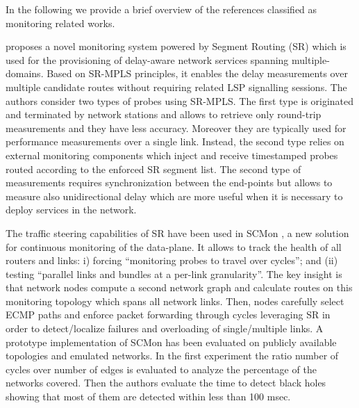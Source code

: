 In the following we provide a brief overview of the references classified as monitoring related works.

\cite{interoperable} proposes a novel monitoring system powered by Segment Routing (SR) which is used for the provisioning of delay-aware network services spanning multiple-domains. Based on SR-MPLS principles, it enables the delay measurements over multiple candidate routes without requiring related LSP signalling sessions. The authors consider two types of probes using SR-MPLS. The first type is originated and terminated by network stations and allows to retrieve only round-trip measurements and they have less accuracy. Moreover they are typically used for performance measurements over a single link. Instead, the second type relies on external monitoring components which inject and receive timestamped probes routed according to the enforced SR segment list. The second type of measurements requires synchronization between the end-points but allows to measure also unidirectional delay which are more useful when it is necessary to deploy services in the network. 

The traffic steering capabilities of SR have been used in SCMon \cite{scmon}, a new solution for continuous monitoring of the data-plane. It allows to track the health of all routers and links: i) forcing ``monitoring probes to travel over cycles''; and (ii) testing ``parallel links and bundles at a per-link granularity''. The key insight is that network nodes compute a second network graph and calculate routes on this monitoring topology which spans all network links. Then, nodes carefully select ECMP paths and enforce packet forwarding through cycles leveraging SR in order to detect/localize failures and overloading of single/multiple links. 
A prototype implementation of SCMon has been evaluated on publicly available topologies and emulated networks. In the first experiment the ratio number of cycles over number of edges is evaluated to analyze the percentage of the networks covered. Then the authors evaluate the time to detect black holes showing that most of them are detected within less than 100 msec. 

